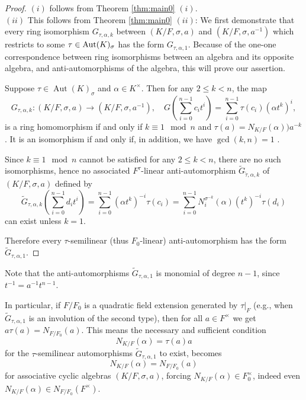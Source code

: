 \documentclass{amsart}
\theoremstyle{plain}
\theoremstyle{definition}
\numberwithin{equation}{section}
\numberwithin{figure}{section}
\DeclareMathOperator{\Aut}{Aut}
\begin{document}
\begin{proof}
$(i)$ follows from  Theorem \ref{thm:main0} $(i)$.
\\ $(ii)$ This follows from Theorem \ref{thm:main0} $(ii)$:
We first demonstrate that every  ring isomorphism $G_{\tau,\alpha,k}$  between $(K/F,\sigma,a)$ and $(K/F,\sigma,a^{-1})$ which restricts to some  $\tau \in {\rm Aut}(K)_\sigma$ has the form $ G_{\tau,\alpha,1}$. Because of the one-one correspondence between ring isomorphisms between an algebra and its opposite algebra, and anti-automorphisms of the algebra, this will prove our assertion.

Suppose $\tau\in \Aut(K)_\sigma$ and $\alpha \in K^\times$.  Then for any $2\leq k < n$, the map
    $$
    G_{\tau,\alpha,k}: (K/F,\sigma,a)\to (K/F,\sigma,a^{-1}),\quad
G ( \sum_{i=0}^{n-1}c_it^i ) = \sum_{i=0}^{n-1}\tau(c_i) (\alpha t^k)^i,
$$
    is a ring homomorphism if and only if  $k\equiv 1 \mod n$ and $\tau(a)=N_{K/F}(\alpha))a^{-k}$.
    It is an isomorphism if and only if, in addition, we have $\gcd(k,n)=1$ \cite[Theorem 4.4]{NevPum2025}.


 Since $k\equiv 1 \mod n$ cannot be satisfied for any $2\leq k < n$, there are no such isomorphisms, hence no associated
 $F^\tau$-linear anti-automorphism $\widetilde G_{\tilde\tau,\alpha,k} $ of
 $(K/F,\sigma,a)$ defined by
 $$\widetilde G_{\tau,\alpha,k}(\sum_{i=0}^{n-1}d_it^i)= \sum_{i=0}^{n-1} (\alpha t^k)^{-i}\tau(c_i) =\sum_{i=0}^{n-1} N_i^{\sigma^{-k}}(\alpha) (t^{k})^{-i}\tau(d_i)$$
 can exist unless $k=1$.

Therefore every $\tau$-semilinear (thus $F_0$-linear) anti-automorphism  has the form $\widetilde G_{\tau,\alpha,1}$.
\end{proof}

 Note that the anti-automorphisms $\widetilde G_{\tau,\alpha,1}$ is monomial of degree $n-1$, since $t^{-1}=a^{-1}t^{n-1}$.


In particular, if $F/F_0$ is a quadratic field extension generated by $\tau|_{F}$ (e.g., when $\widetilde G_{\tau,\alpha,1}$ is an involution of the second type), then for all $a\in F^\times$ we get $a\tau(a)=N_{F/F_0}(a)$. This means the necessary and sufficient condition
$$N_{K/F}( \alpha)= \tau(a)a$$
for the  $\tau$-semilinear automorphisms $\widetilde G_{\tau,\alpha,1}$ to exist, becomes
$$N_{K/F}( \alpha)= N_{F/F_0}(a)$$
for associative cyclic algebras $(K/F,\sigma,a)$,
forcing $N_{K/F}( \alpha)\in F_0^\times$, indeed even  $N_{K/F}( \alpha)\in N_{F/F_0}(F^\times)$.
\end{document}
